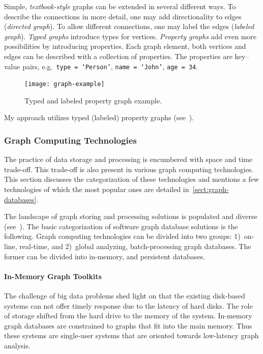 Simple, \emph{textbook-style} graphs can be extended in several different ways. To describe the connections in more detail, one may add directionality to edges (\emph{directed graph}). To allow different connections, one may label the edges (\emph{labeled graph}). \emph{Typed graphs} introduce types for vertices. \emph{Property graphs} add even more possibilities by introducing properties. Each graph element, both vertices and edges can be described with a collection of properties. The properties are key--value pairs, e.g.\ \texttt{type = `Person'}, \texttt{name = `John'}, \texttt{age = 34}.


\begin{figure}[htbp]
	\centering
	\texttt{[image: graph-example]}
	\caption{Typed and labeled property graph example.}
	\label{fig:graph-example}
\end{figure}


My approach utilizes typed (labeled) property graphs (see~).

\subsubsection{Graph Computing Technologies}
The practice of data storage and processing is encumbered with space and time trade-off. This trade-off is also present in various graph computing technologies. This section discusses the categorization of these technologies and mentions a few technologies of which the most popular ones are detailed in~\cref{sect:graph-databases}.

The landscape of graph storing and processing solutions is populated and diverse (see~\cite{zhang_-memory_2015}). The basic categorization of software graph database solutions is the following. Graph computing technologies can be divided into two groups: 1)~on-line, real-time, and 2)~global analyzing, batch-processing graph databases. The former can be divided into in-memory, and persistent databases.

\paragraph{In-Memory Graph Toolkits}
The challenge of big data problems shed light on that the existing disk-based systems can not offer timely response due to the latency of hard disks. The role of storage shifted from the hard drive to the memory of the system. In-memory graph databases are constrained to graphs that fit into the main memory. Thus these systems are single-user systems that are oriented towards low-latency graph analysis.


